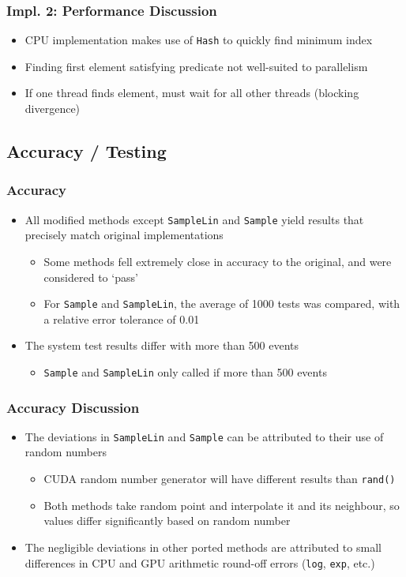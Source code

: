 \documentclass{beamer}
\begin{document}
\begin{frame}
\frametitle{Impl. 2: Performance Discussion}
\begin{itemize}
\item CPU implementation makes use of \texttt{Hash} to quickly find minimum index
\item Finding first element satisfying predicate not well-suited to parallelism
\item If one thread finds element, must wait for all other threads (blocking divergence)
\end{itemize}
\end{frame}

\subsection{Accuracy / Testing}
\begin{frame}
\frametitle{Accuracy}
\begin{itemize}
\item All modified methods except \texttt{SampleLin} and \texttt{Sample}
yield results that precisely match original implementations
\begin{itemize}
\item Some methods fell extremely close in accuracy to 
the original, and were considered to `pass'
\item For \texttt{Sample} and \texttt{SampleLin}, the average of 1000 tests was compared, with a relative error tolerance of 0.01
\end{itemize}

\item The system test results differ with more than 500 events
\begin{itemize}
\item \texttt{Sample} and \texttt{SampleLin} only called if more than 500 events
\end{itemize}
\end{itemize}
\end{frame}

\begin{frame}
\frametitle{Accuracy Discussion}
\begin{itemize}
\item The deviations in \texttt{SampleLin} and \texttt{Sample} can be 
attributed to their use of random numbers
\begin{itemize}
\item CUDA random number generator will have different results than \texttt{rand()}
\item Both methods take random point and interpolate it and its neighbour, so values differ significantly based on random number
\end{itemize}
\item The negligible deviations in other ported methods 
are attributed to small differences in CPU and GPU 
arithmetic round-off errors (\texttt{log}, \texttt{exp}, etc.)
\end{itemize}
\end{frame}
\end{document}
